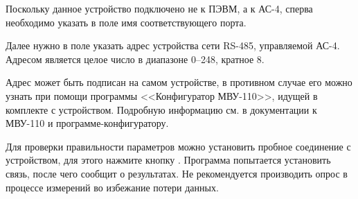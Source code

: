 Поскольку данное устройство подключено не к ПЭВМ, а к АС-4, сперва необходимо указать в поле  имя соответствующего порта.

Далее нужно в поле  указать адрес устройства сети RS-485, управляемой АС-4. Адресом является целое число в диапазоне 0--248, кратное 8.

Адрес может быть подписан на самом устройстве, в противном случае его можно узнать при помощи программы <<Конфигуратор МВУ-110>>, идущей в комплекте с устройством. Подробную информацию см. в документации к МВУ-110 и программе-конфигуратору.


Для проверки правильности параметров можно установить пробное соединение с устройством, для этого нажмите кнопку . Программа попытается установить связь, после чего сообщит о результатах. Не рекомендуется производить опрос в процессе измерений во избежание потери данных.